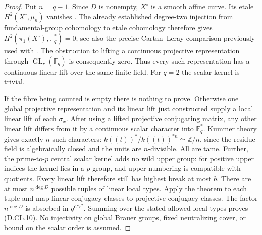 \begin{proof}
Put $n=q-1$. Since $D$ is nonempty, $X^\circ$ is a smooth affine
curve. Its etale $H^2(X^\circ,\mu_n)$ vanishes
\citep[Lemma~59.69.3, Tag~03RR, complete proof]{StacksCurveFixedLocalD}.
The already established degree-two injection from fundamental-group
cohomology to etale cohomology therefore gives
$H^2(\pi_1(X^\circ),\mathbb F_q^*)=0$; see also the precise
Cartan--Leray comparison previously used with
\citep[Theorem~14.9 and Remark~14.10]{MilneLEC2013H2D}.
The obstruction to lifting a continuous projective representation
through $\operatorname{GL}_r(\mathbb F_q)$ is consequently zero.
Thus every such representation has a continuous linear lift over
the same finite field. For $q=2$ the scalar kernel is trivial.

If the fibre being counted is empty there is nothing to prove.
Otherwise one global projective representation and its linear lift
just constructed supply a local linear lift of each $\sigma_x$.
After using a lifted projective conjugating matrix, any other
linear lift differs from it by a continuous scalar character into
$\mathbb F_q^*$. Kummer theory gives exactly $n$ such characters:
$k((t))^*/k((t))^{*n}\simeq\mathbb Z/n$, since the residue field
is algebraically closed and the units are $n$-divisible. All are
tame. Further, the prime-to-$p$ central scalar kernel adds no wild
upper group: for positive upper indices the kernel lies in a
$p$-group, and upper numbering is compatible with quotients.
Every linear lift therefore still has highest break at most $b$.
There are at most $n^{\deg D}$ possible tuples of linear local
types. Apply the theorem to each tuple and map linear conjugacy
classes to projective conjugacy classes. The factor $n^{\deg D}$
is absorbed in $q^{C'r^2}$. Summing over the stated allowed local
types proves (D.CL.10). No injectivity on global Brauer groups,
fixed neutralizing cover, or bound on the scalar order is assumed.
\end{proof}
